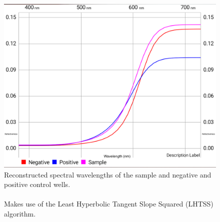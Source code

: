 \begin{figure}[h]
    \centering
    \includegraphics[width=\linewidth]{mnt/fig/lamp-reader-app-curve}
    \caption{Reconstructed spectral wavelengths of the sample and negative and positive control wells.\\
    \\
    Makes use of the Least Hyperbolic Tangent Slope Squared (LHTSS) algorithm.\cite{Burns2015,Burns2019}}
    \label{fig:lamp-reader-app-curve}
\end{figure}